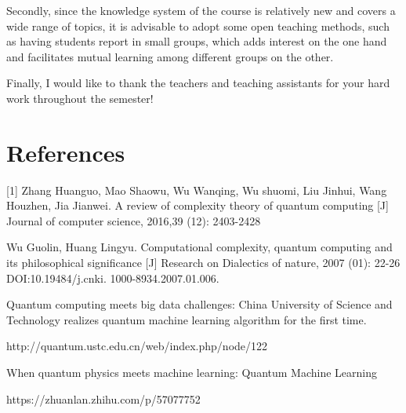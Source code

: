 \documentclass[11pt]{article}
\begin{document}
Secondly, since the knowledge system of the course is relatively new and covers a wide range of topics, it is advisable to adopt some open teaching methods, such as having students report in small groups, which adds interest on the one hand and facilitates mutual learning among different groups on the other.

Finally, I would like to thank the teachers and teaching assistants for your hard work throughout the semester!

\section{References}
[1] Zhang Huanguo, Mao Shaowu, Wu Wanqing, Wu shuomi, Liu Jinhui, Wang Houzhen, Jia Jianwei. A review of complexity theory of quantum computing [J] Journal of computer science, 2016,39 (12): 2403-2428

\noindent[2] Wu Guolin, Huang Lingyu. Computational complexity, quantum computing
and its philosophical significance [J] Research on Dialectics of nature, 2007 (01): 22-26
DOI:10.19484/j.cnki. 1000-8934.2007.01.006.

\noindent[3] Quantum computing meets big data challenges: China University of Science and Technology realizes quantum machine learning algorithm for the first time. 

\noindent http://quantum.ustc.edu.cn/web/index.php/node/122

\noindent[4] When quantum physics meets machine learning: Quantum Machine Learning 

\noindent https://zhuanlan.zhihu.com/p/57077752
\end{document}
